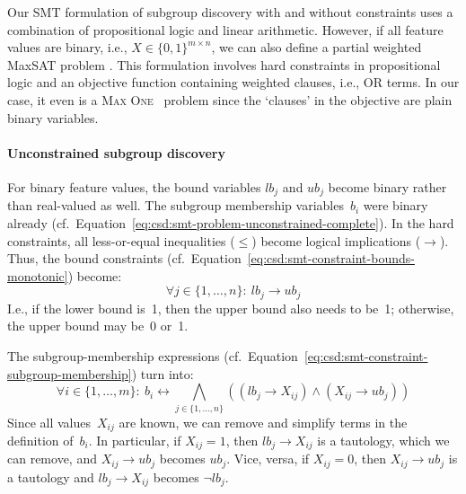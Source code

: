 \documentclass{article}
\theoremstyle{definition}
\begin{document}
Our SMT formulation of subgroup discovery with and without constraints uses a combination of propositional logic and linear arithmetic.
However, if all feature values are binary, i.e., $X \in \{0, 1\}^{m \times n}$, we can also define a partial weighted MaxSAT problem \cite{bacchus2021maximum, li2021maxsat}.
This formulation involves hard constraints in propositional logic and an objective function containing weighted clauses, i.e., OR terms.
In our case, it even is a \textsc{Max One}~\cite{khanna1997complete} problem since the `clauses' in the objective are plain binary variables.

\paragraph{Unconstrained subgroup discovery}

For binary feature values, the bound variables $\mathit{lb}_j$ and $\mathit{ub}_j$ become binary rather than real-valued as well.
The subgroup membership variables~$b_i$ were binary already (cf.~Equation~\ref{eq:csd:smt-problem-unconstrained-complete}).
In the hard constraints, all less-or-equal inequalities ($\leq$) become logical implications ($\rightarrow$).
Thus, the bound constraints (cf.~Equation~\ref{eq:csd:smt-constraint-bounds-monotonic}) become:
%
\begin{equation}
	\forall j \in \{1, \dots, n\}:~ \mathit{lb}_j \rightarrow \mathit{ub}_j
	\label{eq:csd:maxsat-constraint-bounds-monotonic}
\end{equation}
%
I.e., if the lower bound is~1, then the upper bound also needs to be~1; otherwise, the upper bound may be~0 or~1.

The subgroup-membership expressions (cf.~Equation~\ref{eq:csd:smt-constraint-subgroup-membership}) turn into:
%
\begin{equation}
	\forall i \in \{1, \dots, m\}:~ b_i\leftrightarrow \bigwedge_{j \in \{1, \dots, n\}} \left( \left( \mathit{lb}_j \rightarrow X_{ij} \right) \land \left( X_{ij} \rightarrow \mathit{ub}_j \right) \right)
	\label{eq:csd:maxsat-constraint-subgroup-membership}
\end{equation}
%
Since all values~$X_{ij}$ are known, we can remove and simplify terms in the definition of~$b_i$.
In particular, if $X_{ij} = 1$, then $\mathit{lb}_j \rightarrow X_{ij}$ is a tautology, which we can remove, and $X_{ij} \rightarrow \mathit{ub}_j$ becomes $\mathit{ub}_j$.
Vice, versa, if $X_{ij} = 0$, then $X_{ij} \rightarrow \mathit{ub}_j$ is a tautology and $\mathit{lb}_j \rightarrow X_{ij}$ becomes $\lnot \mathit{lb}_j$.
\end{document}
